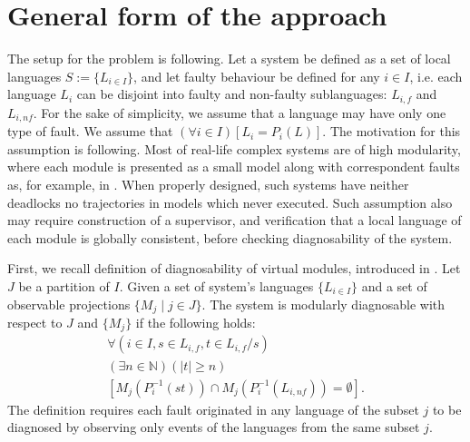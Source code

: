 \documentclass[a4paper, 10pt, conference]{ieeeconf}
\begin{document}
\section{General form of the approach}
\label{sec:General}


% 

The setup for the problem is following. Let a system be defined as a set of
local languages $S := \{L_{i\in I}\}$, and let faulty behaviour be defined for
any $i \in I$, i.e. each language $L_i$ can be disjoint into faulty and
non-faulty sublanguages: $L_{i,f}$ and $L_{i,nf}$. For the sake of simplicity,
we assume that a language may have only one type of fault. We assume that
$(\forall i \in I)\left[ L_i = P_i(L)\right]$. The motivation for this
assumption is following. Most of real-life complex systems are of high
modularity, where each module is presented as a small model along with
correspondent faults as, for example, in \cite{sartini_methodology_2010}. When
properly designed, such systems have neither deadlocks no trajectories in models
which never executed. Such assumption also may require construction of a
supervisor, and verification that a local language of each module is globally
consistent, before checking diagnosability of the system.

First, we recall definition of diagnosability of virtual modules, introduced in
\cite{myadzelets_virtual_2013}.
Let $J$ be a partition of $I$. Given a set of system's languages $\{L_{i \in
I}\}$ and a set of observable projections $\{M_j \mid j \in J \}$. 
The system is modularly diagnosable with respect to $J$ and $\{M_j\}$ 
if the following holds:
\begin{equation}
	\begin{array}{l}
		\forall(i \in I, s \in L_{i,f}, t \in L_{i,f}/s)
		\\
		(\exists n \in \mathbb{N})
		(|t| \geq n)
		\\
		\left[ M_j(P_i^{-1}(st)) \cap M_j(P_i^{-1}(L_{i,nf})) = \emptyset \right].
	\end{array}
\end{equation}
The definition requires each fault originated in any language of the subset $j$
to be diagnosed by observing only events of the languages from the same subset
$j$.
\end{document}
